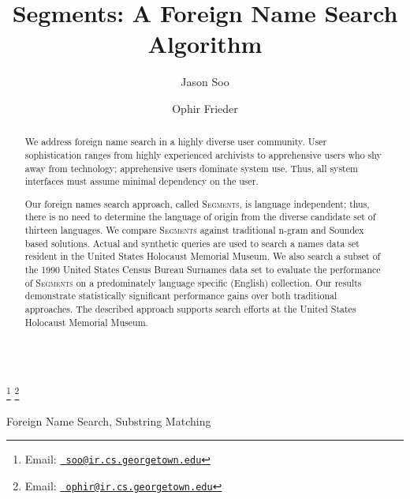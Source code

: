 \documentclass{endm}
\begin{document}
\begin{CJK}{UTF8}{song}
\begin{verbatim}\end{verbatim}\vspace{2.5cm}


\begin{frontmatter}
\title{Segments: A Foreign Name Search Algorithm}


\author{Jason Soo }
\address{School of Computer Science\\ Georgetown University\\ Washington, DC, USA}


\author{Ophir Frieder }
\address{School of Computer Science\\ Georgetown University\\ Washington, DC, USA}

\thanks[myemail]{Email:
   \href{mailto:soo@ir.cs.georgetown.edu} {\texttt{\normalshape
   soo@ir.cs.georgetown.edu}}} 
\thanks[ofemail]{Email:
   \href{mailto:ophir@ir.cs.georgetown.edu} {\texttt{\normalshape
   ophir@ir.cs.georgetown.edu}}} 

\newpage
\begin{abstract}
	We address foreign name search in a highly diverse user community.  User sophistication ranges from highly experienced archivists to apprehensive users who shy away from technology; apprehensive users dominate system use.  Thus, all system interfaces must assume minimal dependency on the user. 

	Our foreign names search approach, called S\textsc{egments}, is language independent; thus, there is no need to determine the language of origin from the diverse candidate set of thirteen languages.  We compare S\textsc{egments} against traditional n-gram and Soundex based solutions.  Actual and synthetic queries are used to search a names data set resident in the United States Holocaust Memorial Museum.  We also search a subset of the 1990 United States Census Bureau Surnames data set to evaluate the performance of S\textsc{egments} on a predominately language specific (English) collection.  Our results demonstrate statistically significant performance gains over both traditional approaches.  The described approach supports search efforts at the United States Holocaust Memorial Museum.
\end{abstract}
\begin{keyword}
Foreign Name Search, Substring Matching
\end{keyword}


\end{frontmatter}
\end{CJK}
\end{document}
